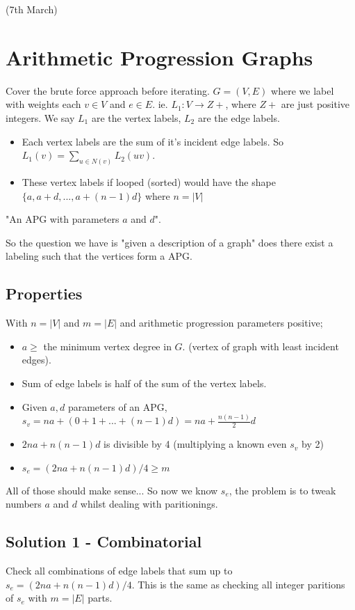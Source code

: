 \documentclass{article}
\begin{document}
(7th March)
\section*{Arithmetic Progression Graphs}
Cover the brute force approach before iterating. $G = (V, E)$ where we label with weights each $v \in V$ and $e \in E$. ie. $L_1 : V \rightarrow Z+$, where $Z+$ are just positive integers. We say $L_1$ are the vertex labels, $L_2$ are the edge labels.

\begin{itemize}
				\item Each vertex labels are the sum of it's incident edge labels. So $L_1(v) = \sum_{u \in N(v)} L_2(uv)$.
				\item These vertex labels if looped (sorted) would have the shape $\{a, a+d,...,a+(n-1)d\}$ where $n=|V|$
\end{itemize}

"An APG with parameters $a$ and $d$".

So the question we have is "given a description of a graph" does there exist a labeling such that the vertices form a APG.

\subsection*{Properties}

With $n = |V|$ and $m = |E|$ and arithmetic progression parameters positive;
\begin{itemize}
				\item $a \geq $ the minimum vertex degree in $G$. (vertex of graph with least incident edges).
				\item Sum of edge labels is half of the sum of the vertex labels.
				\item Given $a,d$ parameters of an APG, $s_v = na + (0 + 1 + ... + (n-1)d) = na + \frac{n(n-1)}{2}d$
				\item $2na + n(n-1)d$ is divisible by 4 (multiplying a known even $s_v$ by 2)
				\item $s_e = (2na + n(n-1)d) / 4 \geq m$
\end{itemize}

All of those should make sense... So now we know $s_e$, the problem is to tweak numbers $a$ and $d$ whilst dealing with paritionings.

\subsection*{Solution 1 - Combinatorial}
Check all combinations of edge labels that sum up to $s_e = (2na + n(n-1)d)/4$. This is the same as checking all integer paritions of $s_e$ with $m = |E|$ parts.
\end{document}
